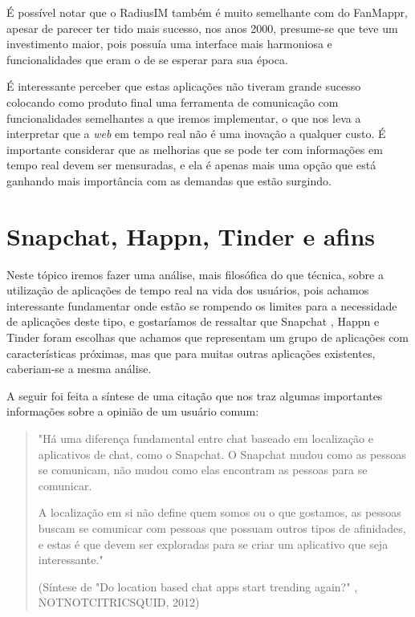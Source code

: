 É possível notar que o RadiusIM também é muito semelhante com do FanMappr, apesar de parecer ter tido mais sucesso, nos anos 2000, presume-se que teve um investimento maior, pois possuía uma interface mais harmoniosa e funcionalidades que eram o de se esperar para sua época.

É interessante perceber que estas aplicações não tiveram grande sucesso colocando como produto final uma ferramenta de comunicação com funcionalidades semelhantes a que iremos implementar, o que nos leva a interpretar que a \textit{web} em tempo real não é uma inovação a qualquer custo. É importante considerar que as melhorias que se pode ter com informações em tempo real devem ser mensuradas, e ela é apenas mais uma opção que está ganhando mais importância com as demandas que estão surgindo.

\section{Snapchat, Happn, Tinder e afins}
Neste tópico iremos fazer uma análise, mais filosófica do que técnica, sobre a utilização de aplicações de tempo real na vida dos usuários, pois achamos interessante fundamentar onde estão se rompendo os limites para a necessidade de aplicações deste tipo, e gostaríamos de ressaltar que Snapchat \cite{snapchat}, Happn \cite{happn} e Tinder \cite{tinder} foram escolhas que achamos que representam um grupo de aplicações com características próximas, mas que para muitas outras aplicações existentes, caberiam-se a mesma análise.

A seguir foi feita a síntese de uma citação \cite{notnotcitricsquid} que nos traz algumas importantes informações sobre a opinião de um usuário comum:

\begin{quote}
	\small "Há uma diferença fundamental entre chat baseado em localização e aplicativos de chat, como o Snapchat. O Snapchat mudou como as pessoas se comunicam, não mudou como elas encontram as pessoas para se comunicar.
	
	A localização em si não define quem somos ou o que gostamos, as pessoas buscam se comunicar com pessoas que possuam outros tipos de afinidades, e estas é que devem ser exploradas para se criar um aplicativo que seja interessante." 
	
	(Síntese de "Do location based chat apps start trending again?" \cite{notnotcitricsquid}, NOTNOTCITRICSQUID, 2012)
\end{quote}

